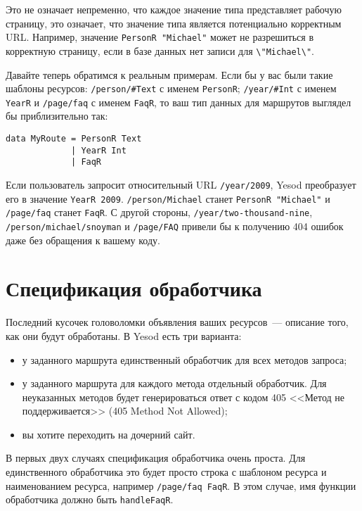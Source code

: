 \begin{remark}
Это не означает непременно, что каждое значение типа представляет
рабочую страницу, это означает, что значение типа является потенциально
корректным URL. Например, значение \lstinline!PersonR "Michael"! может
не разрешиться в корректную страницу, если в базе данных нет записи для
\lstinline!\"Michael\"!.
\end{remark}

Давайте теперь обратимся к реальным примерам. Если бы у вас были такие
шаблоны ресурсов: \lstinline!/person/#Text! с именем
\lstinline!PersonR!; \lstinline!/year/#Int! с именем
\lstinline!YearR! и \lstinline!/page/faq! с именем \lstinline!FaqR!,
то ваш тип данных для маршрутов выглядел бы приблизительно так:
\begin{lstlisting}
data MyRoute = PersonR Text
             | YearR Int
             | FaqR
\end{lstlisting}

Если пользователь запросит относительный URL \lstinline!/year/2009!,
Yesod преобразует его в значение \lstinline!YearR 2009!.
\lstinline!/person/Michael! станет \lstinline!PersonR "Michael"!
и \lstinline!/page/faq! станет \lstinline!FaqR!. С другой
стороны, \lstinline!/year/two-thousand-nine!,
\lstinline!/person/michael/snoyman! и \lstinline!/page/FAQ! привели бы
к получению 404 ошибок даже без обращения к вашему коду.

\section{Спецификация обработчика}
Последний кусочек головоломки объявления ваших ресурсов~--- описание
того, как они будут обработаны. В Yesod есть три варианта:
\begin{itemize}
\item у заданного маршрута единственный обработчик для всех методов запроса;
\item у заданного маршрута для каждого метода отдельный
  обработчик. Для неуказанных методов будет генерироваться ответ с
  кодом 405 <<Метод не поддерживается>> (405 Method Not
  Allowed);
\item вы хотите переходить на дочерний сайт.
\end{itemize}

В первых двух случаях спецификация обработчика очень проста. Для
единственного обработчика это будет просто строка с шаблоном ресурса и
наименованием ресурса, например \lstinline!/page/faq FaqR!. В этом
случае, имя функции обработчика должно быть \lstinline!handleFaqR!.

